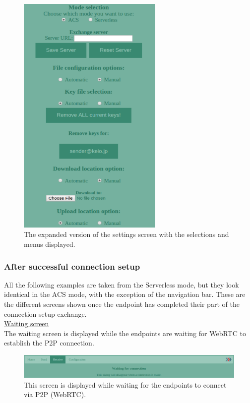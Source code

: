     \begin{figure}[H]
      \centering
      \includegraphics[width=70mm]{Figures/Base/settings_expanded}
      \decoRule
      \caption[SendIt: Detailed settings screen]{The expanded version of the settings screen with the selections and menus displayed.}
      \label{fig:set_det}
    \end{figure}

  \subsubsection*{After successful connection setup}
  \label{sec:file_recv}
    All the following examples are taken from the Serverless mode, but they look identical in the ACS mode, with the exception of the navigation bar. These are the different screens shown once the endpoint has completed their part of the connection setup exchange.\\
     
    \noindent
    \underline{Waiting screen}\\
    The waiting screen is displayed while the endpoints are waiting for WebRTC to establish the P2P connection.
    \begin{figure}[H]
      \centering
      \includegraphics[width=\textwidth]{Figures/Base/waiting}
      \decoRule
      \caption[SendIt: Waiting for connection screen]{This screen is displayed while waiting for the endpoints to connect via P2P (WebRTC).}
      \label{fig:SL_wait}
    \end{figure}

